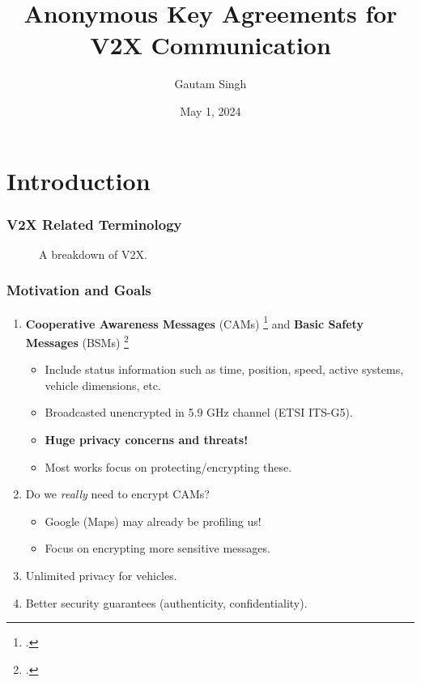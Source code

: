 \documentclass{beamer}
\title[AKA for V2X]{Anonymous Key Agreements for V2X Communication}
\date{May 1, 2024}
\author{Gautam Singh}
\institute[IITH]{Indian Institute of Technology Hyderabad}
\begin{document}
    \maketitle
    \tableofcontents
    \section{Introduction}
    
    \begin{frame}
        \frametitle{V2X Related Terminology}
        \begin{figure}
            \centering
            \resizebox{.8\textwidth}{!}{}
            \caption{A breakdown of V2X.}
        \end{figure}
    \end{frame}

    \begin{frame}
        \frametitle{Motivation and Goals}
        \begin{enumerate}
            \item<1-> \textbf{Cooperative Awareness Messages} (CAMs)
            \footcite{etsi-en-302-637} and \textbf{Basic Safety Messages} (BSMs)
            \footcite{J2735_202309V2XCommunications}
            \begin{itemize}
                \item Include status information such as time, position, speed,
                active systems, vehicle dimensions, etc.
                \item Broadcasted unencrypted in 5.9 GHz channel (ETSI ITS-G5).
                \item<2-> \textbf{Huge privacy concerns and threats!}
                \item<2-> Most works focus on protecting/encrypting these.
            \end{itemize}
            \item<3-> Do we \emph{really} need to encrypt CAMs?
            \begin{itemize}
                \item Google (Maps) may already be profiling us!
                \item Focus on encrypting more sensitive messages.
            \end{itemize}
            \item<4-> Unlimited privacy for vehicles.
            \item<5-> Better security guarantees (authenticity,
            confidentiality).
        \end{enumerate}
    \end{frame}
\end{document}
